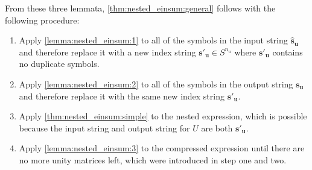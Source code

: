

From these three lemmata, \cref{thm:nested_einsum:general} follows with the following procedure:
\begin{enumerate}[label={\arabic*.}]
    \item Apply \cref{lemma:nested_einsum:1} to all of the symbols in the input string $\bm{\hat{s}_u}$ and therefore replace it with a new index string $\bm{s'_u} \in S^{n_u}$ where $\bm{s'_u}$ contains no duplicate symbols.
    \item Apply \cref{lemma:nested_einsum:2} to all of the symbols in the output string $\bm{s_u}$ and therefore replace it with the same new index string $\bm{s'_u}$.
    \item Apply \cref{thm:nested_einsum:simple} to the nested expression, which is possible because the input string and output string for $U$ are both $\bm{s'_u}$.
    \item Apply \cref{lemma:nested_einsum:3} to the compressed expression until there are no more unity matrices left, which were introduced in step one and two.
\end{enumerate}


